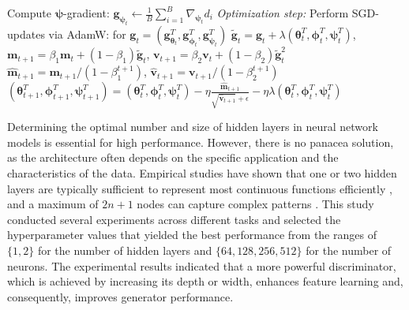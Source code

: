\documentclass[a4paper,12pt]{article}
\theoremstyle{plain} %
\theoremstyle{remark} %
\theoremstyle{definition} %
\begin{document}
\begin{algorithm}[!htb]
{    Compute $\bm{\psi}$-gradient: 
    $\bm{g}_{\bm{\psi}_t} \leftarrow \frac{1}{B}\sum_{i=1}^B\nabla_{\bm{\psi}_t} d_i  $\;
    \emph{Optimization step:} Perform SGD-updates via AdamW: for $\bm{g}_t = (\bm{g}_{\bm{\theta}_t}^T, \bm{g}_{\bm{\phi}_t}^T, \bm{g}_{\bm{\psi}_t}^T)$\;
    $\tilde{\bm{g}}_t = \bm{g}_t+\lambda (\bm{\theta}_t^T, \bm{\phi}_t^T, \bm{\psi}_t^T)$, $\bm{m}_{t+1} = \beta_1 \bm{m}_t + (1 - \beta_1) \tilde{\bm{g}}_t$,
    $\bm{v}_{t+1} = \beta_2 \bm{v}_t + (1 - \beta_2) \tilde{\bm{g}}_t^2$\;
    $\hat{\bm{m}}_{t+1} =\bm{m}_{t+1}/(1-\beta_1^{t+1})$, $\hat{\bm{v}}_{t+1} =\bm{v}_{t+1}/(1-\beta_2^{t+1})$\;
    $(\bm{\theta}_{t+1}^T, \bm{\phi}_{t+1}^T, \bm{\psi}_{t+1}^T) = (\bm{\theta}_t^T, \bm{\phi}_t^T, \bm{\psi}_t^T) - \eta \frac{\hat{\bm{m}}_{t+1}}{\sqrt{\hat{\bm{v}}_{t+1}} + \epsilon} - \eta \lambda (\bm{\theta}_t^T, \bm{\phi}_t^T, \bm{\psi}_t^T)$\;
}
\label{alg:iwavb}
\end{algorithm}

Determining the optimal number and size of hidden layers in neural network models is essential for high performance. However, there is no panacea solution, as the architecture often depends on the specific application and the characteristics of the data. Empirical studies have shown that one or two hidden layers are typically sufficient to represent most continuous functions efficiently \citep{huang1997general,huang2003learning}, and a maximum of $2n+1$ nodes can capture complex patterns \citep{hecht1987kolmogorov}. This study conducted several experiments across different tasks and selected the hyperparameter values that yielded the best performance from the ranges of $\{1,2\}$ for the number of hidden layers and $\{64,128,256,512\}$ for the number of neurons. The experimental results indicated that a more powerful discriminator, which is achieved by increasing its depth or width, enhances feature learning and, consequently, improves generator performance.
\end{document}
